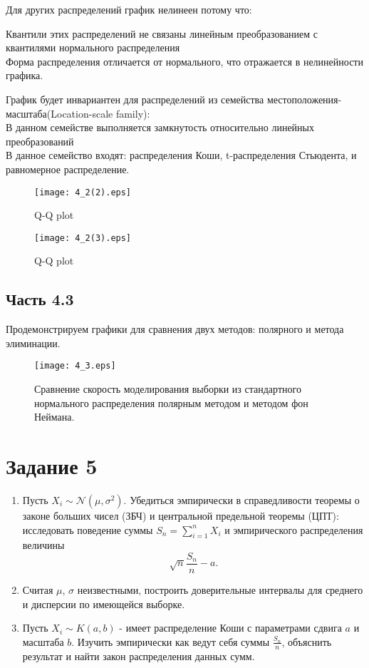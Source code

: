 \documentclass[11pt]{article}
\begin{document}
Для других распределений график нелинеен потому что: 

Квантили этих распределений не связаны линейным преобразованием с квантилями нормального распределения \\
Форма распределения отличается от нормального, что отражается в нелинейности графика.


График будет инвариантен для распределений из семейства местоположения-масштаба(Location-scale family): \\
В данном семействе выполняется замкнутость относительно линейных преобразований \\
В данное семейство входят: распределения Коши, t-распределения Стьюдента, и равномерное распределение.



\begin{figure}[ht]
    \texttt{[image: 4\_2(2).eps]} 
    \caption{Q-Q plot}
\end{figure} 


\begin{figure}[ht]
    \texttt{[image: 4\_2(3).eps]} 
    \caption{Q-Q plot}
\end{figure} 
\FloatBarrier

\subsection{Часть 4.3}
Продемонстрируем графики для сравнения двух методов: полярного и метода элиминации.
\begin{figure}[ht]
    \texttt{[image: 4\_3.eps]} 
    \caption{Сравнение скорость моделирования выборки из стандартного нормального распределения полярным методом и методом фон Неймана.}
\end{figure} 
\FloatBarrier

\section{Задание 5}

\begin{enumerate}
\item Пусть $X_i\sim \mathcal{N}(\mu,\sigma^2)$. Убедиться эмпирически в справедливости теоремы о законе больших чисел (ЗБЧ) и центральной предельной теоремы (ЦПТ): исследовать поведение суммы $S_n = \sum\limits_{i=1}^n X_i$ и эмпирического распределения величины
$$
\sqrt{n}\dfrac{S_n}{n} - a.
$$
\item Считая $\mu$, $\sigma$ неизвестными, построить доверительные интервалы для среднего и дисперсии по имеющейся выборке.
\item Пусть $X_i \sim K(a,b)$ - имеет распределение Коши с параметрами сдвига $a$ и масштаба $b$. Изучить эмпирически как ведут себя суммы $\frac{S_n}{n}$, объяснить результат и найти закон распределения данных сумм.
\end{enumerate}
\end{document}
